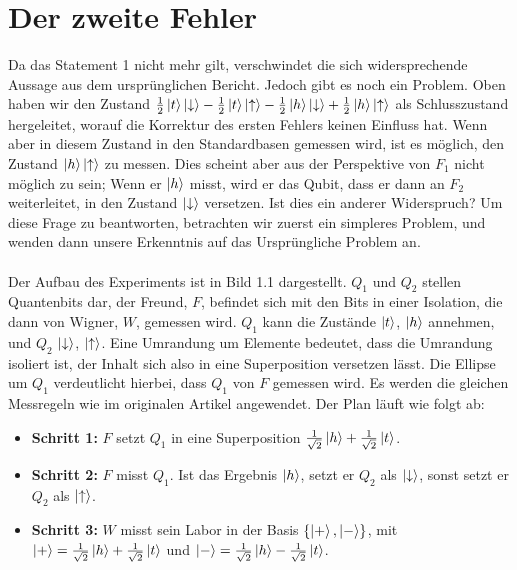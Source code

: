 \documentclass[a4paper]{article}
\begin{document}
\section*{Der zweite Fehler}
Da das Statement 1 nicht mehr gilt, verschwindet die sich widersprechende Aussage aus dem ursprünglichen Bericht. Jedoch gibt es noch ein Problem. Oben haben wir den Zustand $\frac{1}{2}\ket{t}\ket{\downarrow} - \frac{1}{2}\ket{t}\ket{\uparrow} - \frac{1}{2}\ket{h}\ket{\downarrow} + \frac{1}{2}\ket{h}\ket{\uparrow}$ als Schlusszustand hergeleitet, worauf die Korrektur des ersten Fehlers keinen Einfluss hat. Wenn aber in diesem Zustand in den Standardbasen gemessen wird, ist es möglich, den Zustand $\ket{h}\ket{\uparrow}$ zu messen. Dies scheint aber aus der Perspektive von $F_1$ nicht möglich zu sein; Wenn er $\ket{h}$ misst, wird er das Qubit, dass er dann an $F_2$ weiterleitet, in den Zustand $\ket{\downarrow}$ versetzen. Ist dies ein anderer Widerspruch? Um diese Frage zu beantworten, betrachten wir zuerst ein simpleres Problem, und wenden dann unsere Erkenntnis auf das Ursprüngliche Problem an.\\\\
Der Aufbau des Experiments ist in Bild 1.1 dargestellt. $Q_1$ und $Q_2$ stellen Quantenbits dar, der Freund, $F$, befindet sich mit den Bits in einer Isolation, die dann von Wigner, $W$, gemessen wird. $Q_1$ kann die Zustände $\ket{t}$, $\ket{h}$ annehmen, und $Q_2$ $\ket{\downarrow}$, $\ket{\uparrow}$. Eine Umrandung um Elemente bedeutet, dass die Umrandung isoliert ist, der Inhalt sich also in eine Superposition versetzen lässt. Die Ellipse um $Q_1$ verdeutlicht hierbei, dass $Q_1$ von $F$ gemessen wird. Es werden die gleichen Messregeln wie im originalen Artikel angewendet. Der Plan läuft wie folgt ab:
\begin{itemize}
	\item \textbf{Schritt 1:} $F$ setzt $Q_1$ in eine Superposition $\frac{1}{\sqrt{2}} \ket{h} + \frac{1}{\sqrt{2}} \ket{t}$.
	\item \textbf{Schritt 2:} $F$ misst $Q_1$. Ist das Ergebnis $\ket{h}$, setzt er $Q_2$ als $\ket{\downarrow}$, sonst setzt er $Q_2$ als $\ket{\uparrow}$.
	\item \textbf{Schritt 3:} $W$ misst sein Labor in der Basis $\qty{\ket{+}, \ket{-}}$, mit $\ket{+} = \frac{1}{\sqrt{2}} \ket{h} + \frac{1}{\sqrt{2}} \ket{t}$ und $\ket{-} = \frac{1}{\sqrt{2}} \ket{h} - \frac{1}{\sqrt{2}} \ket{t}$.
\end{itemize}
\end{document}
